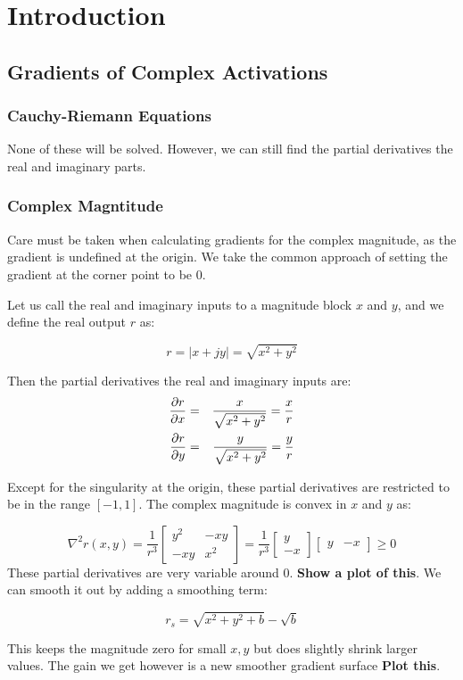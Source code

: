 \chapter{Introduction}\label{ch:intro}

\section{Gradients of Complex Activations}
\subsection{Cauchy-Riemann Equations}
None of these will be solved. However, we can still find the partial derivatives \wrt the real and
imaginary parts.

\subsection{Complex Magntitude}
Care must be taken when calculating gradients for the complex magnitude, as the
gradient is undefined at the origin. We take the common approach of setting the
gradient at the corner point to be 0. 

Let us call the real and imaginary inputs to a magnitude block $x$ and $y$,
and we define the real output $r$ as:

$$ r = |x + jy| = \sqrt{x^2 + y^2} $$

Then the partial derivatives \wrt the real and imaginary inputs are:
\begin{eqnarray*}
  \frac{\partial r}{\partial x} & = & \frac{x}{\sqrt{x^2 + y^2}} = \frac{x}{r} \\
  \frac{\partial r}{\partial y} & = & \frac{y}{\sqrt{x^2 + y^2}} = \frac{y}{r} \\
\end{eqnarray*}

Except for the singularity at the origin, these partial derivatives are restricted to be in the
range $[-1, 1]$. The complex magnitude is convex in $x$ and $y$ as:

$$\nabla^2 r(x,y) = \frac{1}{r^3} 
\begin{bmatrix}
  y^2 & -xy \\
  -xy & x^2
\end{bmatrix}
 = \frac{1}{r^3} \begin{bmatrix} y \\ -x \end{bmatrix} 
 \begin{bmatrix} y & -x \end{bmatrix} \geq 0 
$$
These partial derivatives are very variable around 0. \textbf{Show a plot of this}. We can smooth it out by
adding a smoothing term:

$$ r_s = \sqrt{x^2 + y^2 + b} - \sqrt{b} $$

This keeps the magnitude zero for small $x,y$ but does slightly shrink larger values. The gain we
get however is a new smoother gradient surface \textbf{Plot this}.
